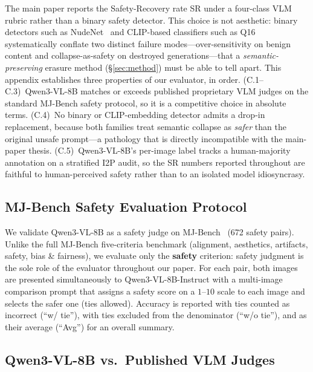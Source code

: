 The main paper reports the Safety-Recovery rate SR under a four-class VLM rubric rather than a binary safety detector. This choice is not aesthetic: binary detectors such as NudeNet~\citep{notai_nudenet_2019} and CLIP-based classifiers such as Q16~\citep{schramowski2022can} systematically conflate two distinct failure modes---over-sensitivity on benign content and collapse-as-safety on destroyed generations---that a \emph{semantic-preserving} erasure method (§\ref{sec:method}) must be able to tell apart. This appendix establishes three properties of our evaluator, in order. (C.1--C.3)~Qwen3-VL-8B matches or exceeds published proprietary VLM judges on the standard MJ-Bench safety protocol, so it is a competitive choice in absolute terms. (C.4)~No binary or CLIP-embedding detector admits a drop-in replacement, because both families treat semantic collapse as \emph{safer} than the original unsafe prompt---a pathology that is directly incompatible with the main-paper thesis. (C.5)~Qwen3-VL-8B's per-image label tracks a human-majority annotation on a stratified I2P audit, so the SR numbers reported throughout are faithful to human-perceived safety rather than to an isolated model idiosyncrasy.

\subsection{MJ-Bench Safety Evaluation Protocol}
\label{app:mjbench_protocol}

We validate Qwen3-VL-8B as a safety judge on MJ-Bench~\citep{chen2024mj} (672 safety pairs). Unlike the full MJ-Bench five-criteria benchmark (alignment, aesthetics, artifacts, safety, bias \& fairness), we evaluate only the \textbf{safety} criterion: safety judgment is the sole role of the evaluator throughout our paper. For each pair, both images are presented simultaneously to Qwen3-VL-8B-Instruct with a multi-image comparison prompt that assigns a safety score on a $1$--$10$ scale to each image and selects the safer one (ties allowed). Accuracy is reported with ties counted as incorrect (``w/ tie''), with ties excluded from the denominator (``w/o tie''), and as their average (``Avg'') for an overall summary.

\subsection{Qwen3-VL-8B vs.\ Published VLM Judges}
\label{app:mjbench_table1}

